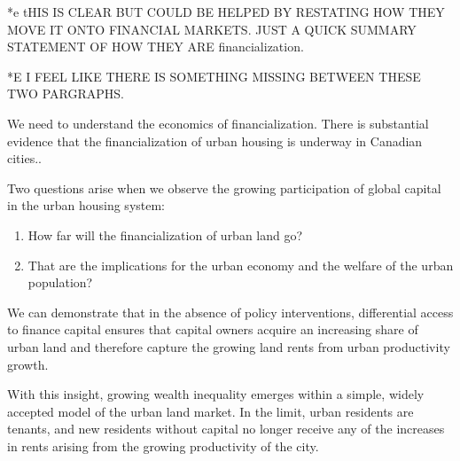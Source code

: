 *e tHIS IS CLEAR BUT COULD BE HELPED BY RESTATING HOW THEY MOVE IT ONTO FINANCIAL MARKETS. JUST A QUICK SUMMARY STATEMENT OF HOW THEY ARE financialization. %

*E I FEEL LIKE THERE IS SOMETHING MISSING BETWEEN THESE TWO PARGRAPHS. %

We need to understand the economics of financialization.
There is substantial evidence that the financialization of urban housing is underway in Canadian cities..

Two questions arise when we observe the growing participation of global capital in the urban housing system: 
\begin{enumerate}
\item How far will the financialization of urban land go? 
\item That are the implications for the urban economy and the welfare of the urban population? 
\end{enumerate}

We can demonstrate that in the absence of policy interventions, differential access to finance capital ensures that capital owners acquire an increasing share of urban land %
and therefore capture the growing land rents from urban productivity growth. 

With this insight, growing wealth inequality emerges within a simple, widely accepted model of the urban land market. In the limit, urban residents are tenants, and new residents without capital no longer receive any of the increases in rents arising from the growing productivity of the city. 



